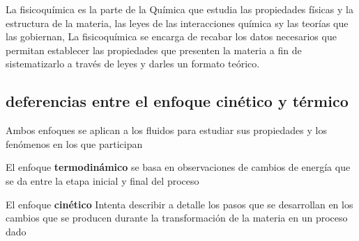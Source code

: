 \documentclass[11pt]{report}
\theoremstyle{plain}
\theoremstyle{definition}
\begin{document}
\tableofcontents




La fisicoquímica es la parte de la Química que estudia las propiedades físicas y la estructura de la materia, las leyes de las interacciones química sy las teorías que las gobiernan, La fisicoquímica se encarga de recabar los datos necesarios que permitan establecer las propiedades que presenten la materia a fin de sistematizarlo a través de leyes y darles un formato teórico.

\subsection{deferencias entre el enfoque cinético y térmico}
Ambos enfoques se aplican a los fluidos para estudiar sus propiedades y los fenómenos en los que participan

El enfoque \textbf{termodinámico} se basa en observaciones de cambios de energía que se da entre la etapa inicial y final del proceso

El enfoque \textbf{cinético} Intenta describir a detalle los pasos que se desarrollan en los cambios que se producen durante la transformación de la materia en un proceso dado













\end{document}
